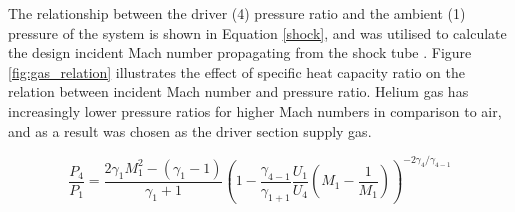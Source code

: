 The relationship between the driver (4) pressure ratio and the ambient (1) pressure of the system is shown in Equation \ref{shock}, and was utilised to calculate the design incident Mach number propagating from the shock tube \citep{anderson2010fundamentals}. Figure \ref{fig:gas_relation} illustrates the effect of specific heat capacity ratio on the relation between incident Mach number and pressure ratio. Helium gas has increasingly lower pressure ratios for higher Mach numbers in comparison to air, and as a result was chosen as the driver section supply gas.

\begin{equation} \label{shock}
\frac{P_4}{P_1} = \frac{2\gamma_1M_1^2 - (\gamma_1 - 1)}{\gamma_1 + 1}\left(1 - \frac{\gamma_{4-1}}{\gamma_{1+1}}\frac{U_1}{U_4}\left(M_1 - \frac{1}{M_1}\right)\right)^{-2\gamma_4/\gamma_{4-1}}
\end{equation}
\smallskip
